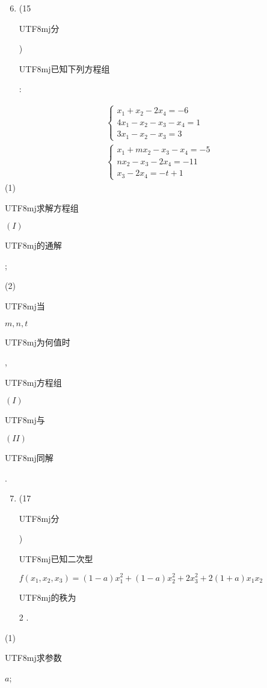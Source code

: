 \documentclass[10pt]{article}
\begin{document}
\begin{enumerate}
  \setcounter{enumi}{5}
  \item (15 \begin{CJK}{UTF8}{mj}分\end{CJK}) \begin{CJK}{UTF8}{mj}已知下列方程组\end{CJK}:
\end{enumerate}
$$
\begin{aligned}
&\left\{\begin{array}{l}
x_{1}+x_{2}-2 x_{4}=-6 \\
4 x_{1}-x_{2}-x_{3}-x_{4}=1 \\
3 x_{1}-x_{2}-x_{3}=3
\end{array}\right. \\
&\left\{\begin{array}{l}
x_{1}+m x_{2}-x_{3}-x_{4}=-5 \\
n x_{2}-x_{3}-2 x_{4}=-11 \\
x_{3}-2 x_{4}=-t+1
\end{array}\right.
\end{aligned}
$$
(1) \begin{CJK}{UTF8}{mj}求解方程组\end{CJK} $(I)$ \begin{CJK}{UTF8}{mj}的通解\end{CJK};

(2) \begin{CJK}{UTF8}{mj}当\end{CJK} $m, n, t$ \begin{CJK}{UTF8}{mj}为何值时\end{CJK}, \begin{CJK}{UTF8}{mj}方程组\end{CJK} $(I)$ \begin{CJK}{UTF8}{mj}与\end{CJK} $(I I)$ \begin{CJK}{UTF8}{mj}同解\end{CJK}.

\begin{enumerate}
  \setcounter{enumi}{6}
  \item (17 \begin{CJK}{UTF8}{mj}分\end{CJK}) \begin{CJK}{UTF8}{mj}已知二次型\end{CJK} $f\left(x_{1}, x_{2}, x_{3}\right)=(1-a) x_{1}^{2}+(1-a) x_{2}^{2}+2 x_{3}^{2}+2(1+a) x_{1} x_{2}$ \begin{CJK}{UTF8}{mj}的秩为\end{CJK} 2 .
\end{enumerate}
(1) \begin{CJK}{UTF8}{mj}求参数\end{CJK} $a$;
\end{document}
